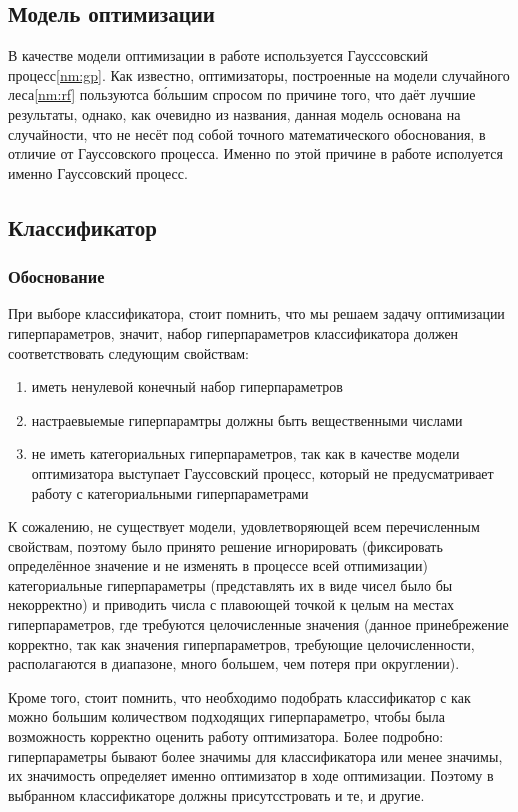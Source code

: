\documentclass[times,specification,annotation]{itmo-student-thesis}
\begin{document}
		\subsection{Модель оптимизации}
		В качестве модели оптимизации в работе используется Гаусссовский процесс\ref{nm:gp}. Как известно, оптимизаторы, построенные на модели случайного леса\ref{nm:rf} пользуютса б\'ольшим спросом по причине того, что даёт лучшие результаты, однако, как очевидно из названия, данная модель основана на случайности, что не несёт под собой точного математического обоснования, в отличие от Гауссовского процесса. Именно по этой причине в работе исполуется именно Гауссовский процесс.
		\subsection{Классификатор}
		\subsubsection{Обоснование}
		При выборе классификатора, стоит помнить, что мы решаем задачу оптимизации гиперпараметров, значит, набор гиперпараметров классификатора должен соответствовать следующим свойствам: 
		\begin{enumerate}
			\item иметь ненулевой конечный набор гиперпараметров
			\item настраевыемые гиперпарамтры должны быть вещественными числами
			\item не иметь категориальных гиперпараметров, так как в качестве модели оптимизатора выступает Гауссовский процесс, который не предусматривает работу с категориальными гиперпараметрами
		\end{enumerate}
		К сожалению, не существует модели, удовлетворяющей всем перечисленным свойствам, поэтому было принято решение игнорировать (фиксировать определённое значение и не изменять в процессе всей отпимизации) категориальные гиперпараметры (представлять их в виде чисел было бы некорректно) и приводить числа с плавоющей точкой к целым на местах гиперпараметров, где требуются целочисленные значения (данное принебрежение корректно, так как значения гиперпараметров, требующие целочисленности, располагаются в диапазоне, много большем, чем потеря при округлении).\par
		Кроме того, стоит помнить, что необходимо подобрать классификатор с как можно большим количеством подходящих гиперпараметро, чтобы была возможность корректно оценить работу оптимизатора. Более подробно: гиперпараметры бывают более значимы для классификатора или менее значимы, их значимость определяет именно оптимизатор в ходе оптимизации. Поэтому в выбранном классификаторе должны присутсстровать и те, и другие.\par
\end{document}
